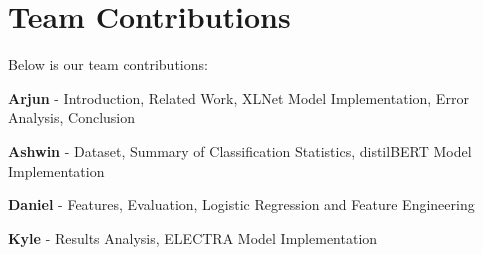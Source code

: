 \documentclass[11pt]{article}
\begin{document}


\nocite{mishra2025musicgenreclassificationusing, LI2024e24892, prajuli2026musicgenreclassificationcomparative}


\section*{Team Contributions}

Below is our team contributions: 

\textbf{Arjun} - Introduction, Related Work, XLNet Model Implementation, Error Analysis, Conclusion

\textbf{Ashwin} - Dataset, Summary of Classification Statistics, distilBERT Model Implementation

\textbf{Daniel} - Features, Evaluation, Logistic Regression and Feature Engineering

\textbf{Kyle} - Results Analysis, ELECTRA Model Implementation

%





\end{document}
